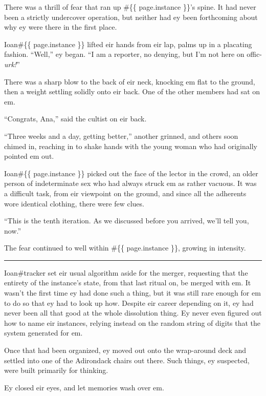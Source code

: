 There was a thrill of fear that ran up \#\{\{ page.instance \}\}'s spine. It had never been a strictly undercover operation, but neither had ey been forthcoming about why ey were there in the first place.

Ioan\#\{\{ page.instance \}\} lifted eir hands from eir lap, palms up in a placating fashion. ``Well,'' ey began. ``I am a reporter, no denying, but I'm not here on offic-\emph{urk!}''

There was a sharp blow to the back of eir neck, knocking em flat to the ground, then a weight settling solidly onto eir back. One of the other members had sat on em.

``Congrats, Ana,'' said the cultist on eir back.

``Three weeks and a day, getting better,'' another grinned, and others soon chimed in, reaching in to shake hands with the young woman who had originally pointed em out.

Ioan\#\{\{ page.instance \}\} picked out the face of the lector in the crowd, an older person of indeterminate sex who had always struck em as rather vacuous. It was a difficult task, from eir viewpoint on the ground, and since all the adherents wore identical clothing, there were few clues.

``This is the tenth iteration. As we discussed before you arrived, we'll tell you, now.''

The fear continued to well within \#\{\{ page.instance \}\}, growing in intensity.

\begin{center}\rule{0.5\linewidth}{\linethickness}\end{center}

Ioan\#tracker set eir usual algorithm aside for the merger, requesting that the entirety of the instance's state, from that last ritual on, be merged with em. It wasn't the first time ey had done such a thing, but it was still rare enough for em to do so that ey had to look up how. Despite eir career depending on it, ey had never been all that good at the whole dissolution thing. Ey never even figured out how to name eir instances, relying instead on the random string of digits that the system generated for em.

Once that had been organized, ey moved out onto the wrap-around deck and settled into one of the Adirondack chairs out there. Such things, ey suspected, were built primarily for thinking.

Ey closed eir eyes, and let memories wash over em.

